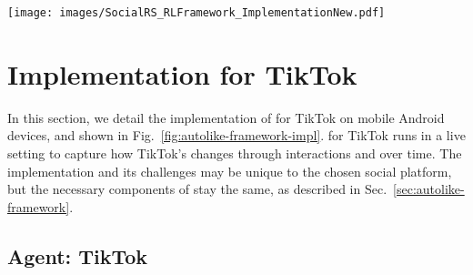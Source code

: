 
\begin{figure*}[t!]
	\centering
\texttt{[image: images/SocialRS\_RLFramework\_ImplementationNew.pdf]}
	\caption{{\textbf{\autolike{} Implementation.} We implement \autolike{} for the TikTok Android app. It works in the following ways. Once the user gives the inputs, \autolike{} (1) opens TikTok to its ``For You'' page and extracts the TikTok URL of the current recommended content; (2) sends it to a backend server and the server visits the TikTok URL in a web browser; (3) extracts the text description and transcribes the video's audio into text, and concatenates both into one string; (5) classifies the text into $\langle$Topic, Sentiment$\rangle$; and (6) calculates the reward, and follows a policy to select and take an action (\eg{} liking the current TikTok); and (7) scrolls to the next TikTok. \autolike{} repeats 1--7 until some time horizon $T$. We omit the output of pathways for brevity, see Fig.~\ref{fig:autolike-framework}.}}
	\label{fig:autolike-framework-impl}
    \vspace{-5pt}
\end{figure*}

\section{\autolike{} Implementation for TikTok}
\label{sec:autolike-impl}


In this section, we detail the implementation of \autolike{} for TikTok on mobile Android devices, and shown in Fig.~\ref{fig:autolike-framework-impl}.
\autolike{} for TikTok runs in a live setting to capture how TikTok's \rs{} changes through interactions and over time. The implementation and its challenges may be unique to the chosen social platform, but the necessary components of \autolike{} stay the same, as described in Sec.~\ref{sec:autolike-framework}. %


\subsection{Agent: TikTok}
\label{sec:autolike-agent}


